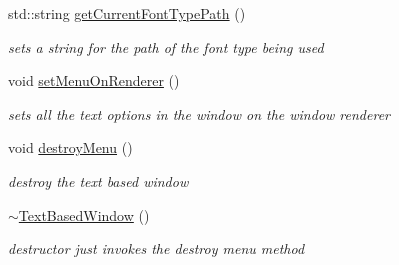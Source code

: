\begin{DoxyCompactItemize}
\hypertarget{class_text_based_window_a3e5f231c415cbe72cc5dca78376f0455}{}\label{class_text_based_window_a3e5f231c415cbe72cc5dca78376f0455} 
std\+::string \hyperlink{class_text_based_window_a3e5f231c415cbe72cc5dca78376f0455}{get\+Current\+Font\+Type\+Path} ()
\begin{DoxyCompactList}\small\item\em sets a string for the path of the font type being used \end{DoxyCompactList}\item 
\hypertarget{class_text_based_window_ae7fbedb72a6073234ef2da5697d4bbb6}{}\label{class_text_based_window_ae7fbedb72a6073234ef2da5697d4bbb6} 
void \hyperlink{class_text_based_window_ae7fbedb72a6073234ef2da5697d4bbb6}{set\+Menu\+On\+Renderer} ()
\begin{DoxyCompactList}\small\item\em sets all the text options in the window on the window renderer \end{DoxyCompactList}\item 
\hypertarget{class_text_based_window_a977eef5200047927a40c51b20e1b129f}{}\label{class_text_based_window_a977eef5200047927a40c51b20e1b129f} 
void \hyperlink{class_text_based_window_a977eef5200047927a40c51b20e1b129f}{destroy\+Menu} ()
\begin{DoxyCompactList}\small\item\em destroy the text based window \end{DoxyCompactList}\item 
\hypertarget{class_text_based_window_ac704b70a18c11eb3133e7e5dfe5780d9}{}\label{class_text_based_window_ac704b70a18c11eb3133e7e5dfe5780d9} 
\hyperlink{class_text_based_window_ac704b70a18c11eb3133e7e5dfe5780d9}{$\sim$\+Text\+Based\+Window} ()
\begin{DoxyCompactList}\small\item\em destructor just invokes the destroy menu method \end{DoxyCompactList}\end{DoxyCompactItemize}
